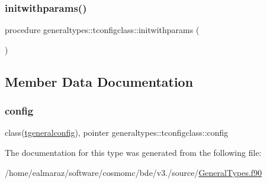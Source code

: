 \subsubsection{\texorpdfstring{initwithparams()}{initwithparams()}}
{\footnotesize\ttfamily procedure generaltypes\+::tconfigclass\+::initwithparams (\begin{DoxyParamCaption}{ }\end{DoxyParamCaption})\hspace{0.3cm}{\ttfamily [private]}}



\subsection{Member Data Documentation}
\mbox{\label{structgeneraltypes_1_1tconfigclass_af7384e3f52a6159d600016ae42783a6a}} 
\subsubsection{\texorpdfstring{config}{config}}
{\footnotesize\ttfamily class(\mbox{\hyperlink{structgeneraltypes_1_1tgeneralconfig}{tgeneralconfig}}), pointer generaltypes\+::tconfigclass\+::config\hspace{0.3cm}{\ttfamily [private]}}



The documentation for this type was generated from the following file\+:\begin{DoxyCompactItemize}
\item 
/home/ealmaraz/software/cosmomc/bde/v3./source/\mbox{\hyperlink{GeneralTypes_8f90}{General\+Types.\+f90}}\end{DoxyCompactItemize}
